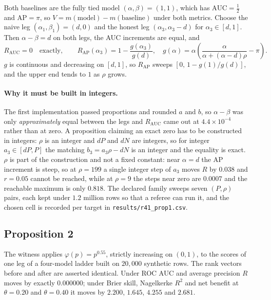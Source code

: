 \documentclass[preprint,12pt]{elsarticle}
\begin{document}
Both baselines are the fully tied model $(\alpha,\beta) = (1,1)$, which has
$\mathrm{AUC} = \tfrac12$ and $\mathrm{AP} = \pi$, so $V = m(\text{model}) -
m(\text{baseline})$ under both metrics. Choose the naive leg
$(\alpha_1,\beta_1) = (d, 0)$ and the honest leg $(\alpha_3, \alpha_3 - d)$ for
$\alpha_3 \in [d,1]$. Then $\alpha - \beta = d$ on both legs, the AUC
increments are equal, and
\[
  R_{\mathrm{AUC}} = 0
  \quad\text{exactly},\qquad
  R_{\mathrm{AP}}(\alpha_3)
   = 1 - \frac{g(\alpha_3)}{g(d)},\quad
  g(\alpha) = \alpha\!\left(\frac{\alpha}{\alpha + (\alpha-d)\rho} - \pi\right).
\]
$g$ is continuous and decreasing on $[d,1]$, so $R_{\mathrm{AP}}$ sweeps
$[0,\, 1 - g(1)/g(d)]$, and the upper end tends to $1$ as $\rho$ grows.

\paragraph{Why it must be built in integers.} The first implementation passed
proportions and rounded $a$ and $b$, so $\alpha - \beta$ was only
\emph{approximately} equal between the legs and $R_{\mathrm{AUC}}$ came out at
$4.4\times 10^{-4}$ rather than at zero. A proposition claiming an exact zero
has to be constructed in integers: $\rho$ is an integer and $dP$ and $dN$ are
integers, so for integer $a_3 \in [dP, P]$ the matching $b_3 = a_3\rho - dN$ is
an integer and the equality is exact. $\rho$ is part of the construction and
not a fixed constant: near $\alpha = d$ the AP increment is steep, so at
$\rho = 199$ a single integer step of $a_3$ moves $R$ by $0.038$ and
$r = 0.05$ cannot be reached, while at $\rho = 9$ the steps near zero are
$0.0007$ and the reachable maximum is only $0.818$. The declared family sweeps
seven $(P,\rho)$ pairs, each kept under $1.2$ million rows so that a referee
can run it, and the chosen cell is recorded per target in
\texttt{results/r41\_prop1.csv}.

\subsection*{Proposition 2}

The witness applies $\varphi(p) = p^{0.55}$, strictly increasing on $(0,1)$,
to the scores of one leg of a four-model ladder built on $20{,}000$ synthetic
rows. The rank vectors before and after are asserted identical. Under ROC AUC
and average precision $R$ moves by exactly $0.000000$; under Brier skill,
Nagelkerke $R^2$ and net benefit at $\theta = 0.20$ and $\theta = 0.40$ it
moves by $2.200$, $1.645$, $4.255$ and $2.681$.
\end{document}

